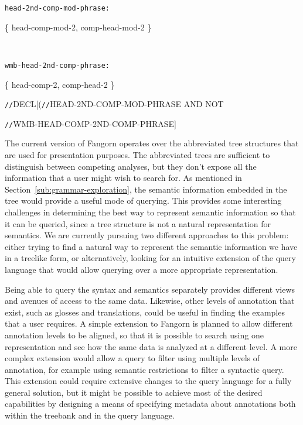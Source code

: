 \begin{exe}
\ex\label{ex:gram}
{\small\tt\small  head-2nd-comp-mod-phrase:

 \{ head-comp-mod-2, comp-head-mod-2 \}}\\
{\small\tt\small  wmb-head-2nd-comp-phrase:

 \{ head-comp-2, comp-head-2 \}}
\end{exe}

\begin{exe}
\ex\label{ex:qry5}\small
\verb=//=DECL[(\verb=//=HEAD-2ND-COMP-MOD-PHRASE AND NOT 

\verb=//=WMB-HEAD-COMP-2ND-COMP-PHRASE]
\end{exe}

The current version of Fangorn operates over the abbreviated tree
structures that are used for presentation purposes. The abbreviated trees are
sufficient to distinguish between competing analyses, but they don't expose all
the information that a user might wish to search for. As mentioned in
Section~\ref{sub:grammar-exploration}, the semantic information embedded in the
tree would provide a useful mode of querying. This provides some interesting
challenges in determining the best way to represent semantic information so that
it can be queried, since a tree structure is not a natural representation for
semantics.  We are currently pursuing two different approaches to this problem:
either trying to find a natural way to represent the semantic information we
have in a treelike form, or alternatively, looking for an intuitive extension of
the query language that would allow querying over a more appropriate 
representation.

Being able to query the syntax and semantics separately provides different views
and avenues of access to the same data. Likewise, other levels of annotation
that exist, such as glosses and translations, could be useful in finding the
examples that a user requires. A simple extension to Fangorn is planned
to allow different annotation levels to be aligned, so that it is possible to
search using one representation and see how the same data is analyzed at a
different level. A more complex extension would allow a query to filter using
multiple levels of annotation, for example using semantic restrictions to filter
a syntactic query. This extension could require extensive changes to the query
language for a fully general solution, but it might be possible to achieve most
of the desired capabilities by designing a means of specifying metadata about
annotations both within the treebank and in the query language.

